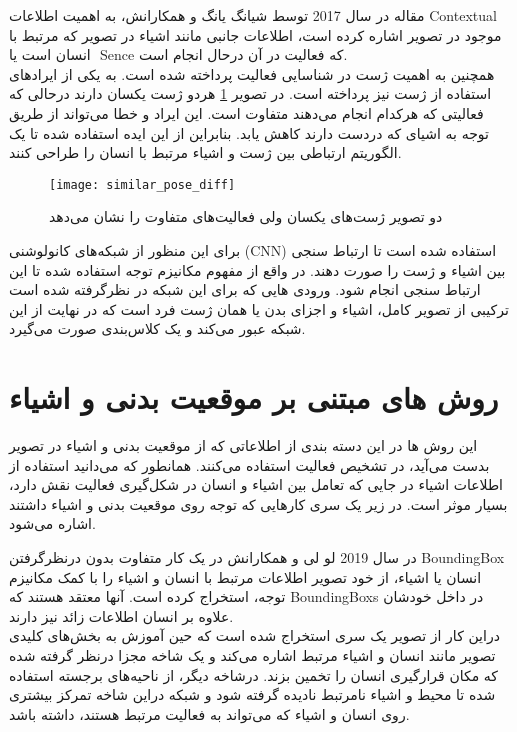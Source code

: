  مقاله %
 \cite{Multi_branch_Attention_Recg_still}
 در سال 2017 توسط شیانگ یانگ و همکارانش، به اهمیت اطلاعات %
\gls{Contextual}
  موجود در تصویر اشاره کرده است، اطلاعات جانبی مانند اشیاء در تصویر که مرتبط با انسان است یا ‌%
\gls{Sence}
 که فعالیت در آن درحال انجام است.\\
 همچنین به اهمیت ژست در شناسایی فعالیت پرداخته شده است. به یکی از ایرادهای استفاده از ژست نیز پرداخته است. در تصویر %
\ref{fig:similar_pose_diff}
 هردو ژست یکسان دارند درحالی که فعالیتی که هرکدام انجام می‌دهند متفاوت است. این ایراد و خطا می‌تواند از طریق توجه به اشیای که دردست دارند کاهش یابد. بنابراین از این ایده استفاده شده تا یک الگوریتم ارتباطی بین ژست و اشیاء مرتبط با انسان را طراحی کنند.\\
 \begin{figure}[ht]
 	\centerline{\texttt{[image: similar\_pose\_diff]}}
 	\caption[دو تصویر ژست‌های یکسان ولی فعالیت‌های متفاوت را نشان می‌دهد]{دو تصویر ژست‌های یکسان ولی فعالیت‌های متفاوت را نشان می‌دهد
 		\cite{Multi_branch_Attention_Recg_still}
 		}
 	\label{fig:similar_pose_diff}
 \end{figure}
 برای این منظور از شبکه‌های کانولوشنی (CNN) استفاده شده است تا ارتباط سنجی بین اشیاء و ژست را صورت دهند. در واقع از مفهوم مکانیزم توجه استفاده شده تا این ارتباط سنجی انجام شود. ورودی هایی که برای این شبکه در نظرگرفته شده است ترکیبی از تصویر کامل، اشیاء و اجزای بدن یا همان ژست فرد است که در نهایت از این شبکه عبور می‌کند و یک کلاس‌بندی صورت می‌گیرد.\\ 
 
\section{روش های مبتنی بر موقعیت بدنی و اشیاء}

این روش ها در این دسته بندی از اطلاعاتی که از موقعیت بدنی و اشیاء در تصویر بدست می‌آید، در تشخیص فعالیت استفاده می‌کنند. همانطور که می‌دانید استفاده از اطلاعات اشیاء در جایی که تعامل بین اشیاء و انسان در شکل‌گیری فعالیت نقش دارد، بسیار موثر است. در زیر یک سری کارهایی که توجه روی موقعیت بدنی و اشیاء داشتند اشاره می‌شود.

در سال 2019 لو لی و همکارانش %
\cite{Loss_guided_actv_attention}
در یک کار متفاوت بدون درنظرگرفتن %
\gls{BoundingBox}
 انسان یا اشیاء، از خود تصویر اطلاعات مرتبط با انسان و اشیاء را با کمک مکانیزم توجه، استخراج کرده است. آنها معتقد هستند که %
 \glspl{BoundingBox}
 در داخل خودشان علاوه بر انسان اطلاعات زائد نیز دارند.\\
دراین کار از تصویر یک سری %
استخراج شده است که حین آموزش به بخش‌های کلیدی تصویر مانند انسان و اشیاء مرتبط اشاره می‌کند و یک شاخه مجزا درنظر گرفته شده که مکان قرارگیری انسان را تخمین بزند. درشاخه دیگر، از ناحیه‌های برجسته استفاده شده تا محیط و اشیاء نامرتبط نادیده گرفته شود و شبکه دراین شاخه تمرکز بیشتری روی انسان و اشیاء که می‌تواند به فعالیت مرتبط هستند،‌ داشته باشد.

